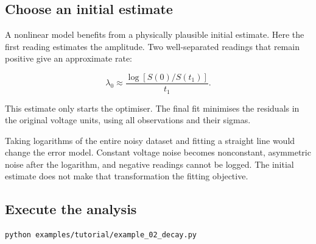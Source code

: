 \documentclass[
  british,
  10pt,
  a4paper,
]{article}
\begin{document}

\subsection{Choose an initial
estimate}\label{choose-an-initial-estimate}

A nonlinear model benefits from a physically plausible initial estimate.
Here the first reading estimates the amplitude. Two well-separated
readings that remain positive give an approximate rate:

\begin{equation}\lambda_0 \approx
\frac{\log[S(0)/S(t_1)]}{t_1}.\end{equation}

This estimate only starts the optimiser. The final fit minimises the
residuals in the original voltage units, using all observations and
their sigmas.

Taking logarithms of the entire noisy dataset and fitting a straight
line would change the error model. Constant voltage noise becomes
nonconstant, asymmetric noise after the logarithm, and negative readings
cannot be logged. The initial estimate does not make that transformation
the fitting objective.


\subsection{Execute the analysis}\label{execute-the-analysis}

\par\noindent\begin{minipage}{\linewidth}

\begin{lstlisting}[language=sh]
python examples/tutorial/example_02_decay.py
\end{lstlisting}

\end{minipage}\par
\end{document}
